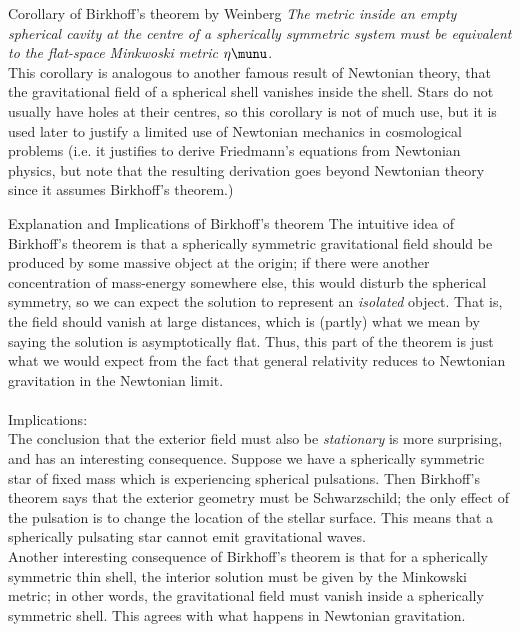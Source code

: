 \begin{mybox}{Corollary of Birkhoff's theorem by Weinberg}
	\emph{The metric inside an empty spherical cavity at the centre of a spherically symmetric system must be equivalent to the flat-space Minkwoski metric} $\eta\munu$.\\
	This corollary is analogous to another famous result of Newtonian theory, that the gravitational field of a spherical shell vanishes inside the shell. Stars do not usually have holes at their centres, so this corollary is not of much use, but it is used later to justify a limited use of Newtonian mechanics in cosmological problems (i.e. it justifies to derive Friedmann's equations from Newtonian physics, but note that the resulting derivation goes beyond Newtonian theory since it assumes Birkhoff's theorem.)
\end{mybox}
\begin{mybox}{Explanation and Implications of Birkhoff's theorem}
The intuitive idea of Birkhoff's theorem is that a spherically symmetric gravitational field should be produced by some massive object at the origin; if there were another concentration of mass-energy somewhere else, this would disturb the spherical symmetry, so we can expect the solution to represent an \emph{isolated} object. That is, the field should vanish at large distances, which is (partly) what we mean by saying the solution is asymptotically flat. Thus, this part of the theorem is just what we would expect from the fact that general relativity reduces to Newtonian gravitation in the Newtonian limit.\\
\\
Implications:\\
The conclusion that the exterior field must also be \emph{stationary} is more surprising, and has an interesting consequence. Suppose we have a spherically symmetric star of fixed mass which is experiencing spherical pulsations. Then Birkhoff's theorem says that the exterior geometry must be Schwarzschild; the only effect of the pulsation is to change the location of the stellar surface. This means that a spherically pulsating star cannot emit gravitational waves.\\
Another interesting consequence of Birkhoff's theorem is that for a spherically symmetric thin shell, the interior solution must be given by the Minkowski metric; in other words, the gravitational field must vanish inside a spherically symmetric shell. This agrees with what happens in Newtonian gravitation.
\end{mybox}

